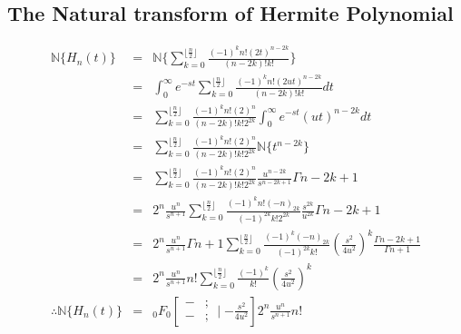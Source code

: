  \subsection{The Natural transform of Hermite Polynomial}
 \begin{eqnarray*}
  \mathbb{N}\lbrace H_{n}(t)\rbrace &=& \mathbb{N}\lbrace { \sum_{k=0}^{\lfloor\frac{n}{2}\rfloor} \frac{(-1)^{k}n!(2t)^{n-2k}}{(n-2k)!k!}}\rbrace\\ 
  &=&\int_{0}^{\infty} e^{-st} \sum_{k=0}^{\lfloor\frac{n}{2}\rfloor} \frac{(-1)^{k}n!(2ut)^{n-2k}}{(n-2k)!k!}dt\\
 &=&  \sum_{k=0}^{\lfloor\frac{n}{2}\rfloor} \frac{(-1)^{k}n!(2)^{n}}{(n-2k)!k!2^{2k}}\int_{0}^{\infty} e^{-st}(ut)^{n-2k}dt\\
 &=&  \sum_{k=0}^{\lfloor\frac{n}{2}\rfloor} \frac{(-1)^{k}n!(2)^{n}}{(n-2k)!k!2^{2k}}\mathbb{N}\lbrace{ t^{n-2k}}\rbrace\\
  &=& \sum_{k=0}^{\lfloor\frac{n}{2}\rfloor} \frac{(-1)^{k}n!(2)^{n}}{(n-2k)!k!2^{2k}} \frac{u^{n-2k}}{s^{n-2k+1}}\Gamma{n-2k+1}\\
  &=&2^{n}\frac{u^{n}}{s^{n+1}}\sum_{k=0}^{\lfloor\frac{n}{2}\rfloor} \frac{(-1)^{k}n!(-n)_{2k}}{(-1)^{2k}k!2^{2k}} \frac{s^{2k}}{u^{2k}}\Gamma{n-2k+1}\\
 &=&2^{n}\frac{u^{n}}{s^{n+1}}\Gamma{n+1}\sum_{k=0}^{\lfloor\frac{n}{2}\rfloor} \frac{(-1)^{k}(-n)_{2k}}{(-1)^{2k}k!} \left( \frac{s^{2}}{4u^{2}}\right) ^{k}\frac{\Gamma{n-2k+1}}{\Gamma{n+1}}\\
   &=&2^{n}\frac{u^{n}}{s^{n+1}}n!\sum_{k=0}^{\lfloor\frac{n}{2}\rfloor} \frac{(-1)^{k}}{k!} \left( \frac{s^{2}}{4u^{2}}\right) ^{k}\\
  \therefore \mathbb{N}\lbrace H_{n}(t)\rbrace &=& {}_0 F_0\left[ \begin{array}{cc}
   -  &;\\
   -  &; 
  \end{array}
 \mid{-\frac{s^2}{4u^2}}
 \right]2^{n}\frac{u^{n}}{s^{n+1}}n!
 \end{eqnarray*}
